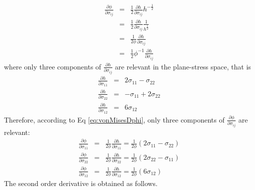 \documentclass[12pt]{amsart}
\begin{document}
\begin{eqnarray}
  \label{eq:vonMisesDphi}
  \frac{\partial \phi}{\partial\sigma_{ij}}&=& \frac{1}{2}\frac{\partial h}{\partial \sigma_{ij}} h^{-\frac{1}{2}}\\
                                          &=&\frac{1}{2}\frac{\partial h}{\partial \sigma_{ij}} \frac{1}{h^\frac{1}{2}}\nonumber\\
                                          &=&\frac{1}{2\phi}\frac{\partial h}{\partial \sigma_{ij}}\nonumber\\
                                          &=&\frac{1}{2}\phi^{-1} \frac{\partial h}{\partial \sigma_{ij}}\nonumber
                                        \end{eqnarray}
where only three components of $\frac{\partial h}{\partial \sigma_{ij}}$ are relevant in the plane-stress space, that is
\begin{eqnarray}
  \label{eq:dh}
  \frac{\partial h}{\partial \sigma_{11}}&=&2\sigma_{11}-\sigma_{22} \\
  \frac{\partial h}{\partial \sigma_{22}}&=&-\sigma_{11}+2\sigma_{22}\\
  \frac{\partial h}{\partial \sigma_{12}}&=&6\sigma_{12}
\end{eqnarray}
Therefore, according to Eq \ref{eq:vonMisesDphi}, only three components of $\frac{\partial \phi}{\partial\sigma_{ij}}$ are relevant:
\begin{eqnarray}
  \label{eq:vonMisesDphi}
  \frac{\partial \phi}{\partial\sigma_{11}}&=&\frac{1}{2\phi}\frac{\partial h}{\partial \sigma_{11}}=\frac{1}{2\phi} (2\sigma_{11}-\sigma_{22})\\
  \frac{\partial \phi}{\partial\sigma_{22}}&=&\frac{1}{2\phi}\frac{\partial h}{\partial \sigma_{22}}=\frac{1}{2\phi} (2\sigma_{22}-\sigma_{11})\\
  \frac{\partial \phi}{\partial\sigma_{12}}&=&\frac{1}{2\phi}\frac{\partial h}{\partial \sigma_{12}}=\frac{1}{2\phi} (6\sigma_{12})
\end{eqnarray}
The second order derivative is obtained as follows.
\end{document}
